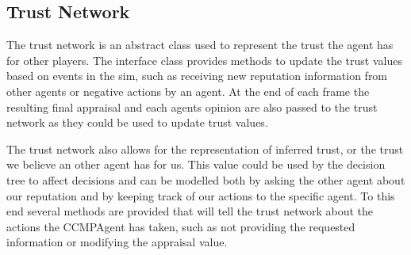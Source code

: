 \subsection{Trust Network}
The trust network is an abstract class used to represent the trust the agent
has for other players.  The interface class provides methods to update the
trust values based on events in the sim, such as receiving new reputation
information from other agents or negative actions by an agent.  At the end of
each frame the resulting final appraisal and each agents opinion are also
passed to the trust network as they could be used to update trust values.

The trust network also allows for the representation of inferred trust, or the
trust we believe an other agent has for us.  This value could be used by the
decision tree to affect decisions and can be modelled both by asking the other
agent about our reputation and by keeping track of our actions to the specific
agent.  To this end several methods are provided that will tell the trust
network about the actions the CCMPAgent has taken, such as not providing the
requested information or modifying the appraisal value.

